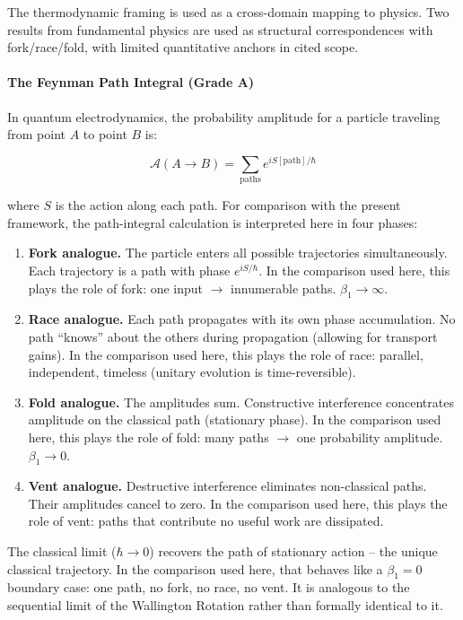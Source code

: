 \documentclass[
  11pt,
]{article}
\begin{document}
The thermodynamic framing is used as a cross-domain mapping to physics.
Two results from fundamental physics are used as structural
correspondences with fork/race/fold, with limited quantitative anchors
in cited scope.

\paragraph{The Feynman Path Integral (Grade
A)}\label{the-feynman-path-integral-grade-a}

In quantum electrodynamics, the probability amplitude for a particle
traveling from point \(A\) to point \(B\) is:

\[
\mathcal{A}(A \to B) = \sum_{\text{paths}} e^{iS[\text{path}]/\hbar}
\]

where \(S\) is the action along each path. For comparison with the
present framework, the path-integral calculation is interpreted here in
four phases:

\begin{enumerate}
\def\labelenumi{\arabic{enumi}.}
\item
  \textbf{Fork analogue.} The particle enters all possible trajectories
  simultaneously. Each trajectory is a path with phase \(e^{iS/\hbar}\).
  In the comparison used here, this plays the role of fork: one input
  \(\to\) innumerable paths. \(\beta_1 \to \infty\).
\item
  \textbf{Race analogue.} Each path propagates with its own phase
  accumulation. No path ``knows'' about the others during propagation
  (allowing for transport gains). In the comparison used here, this
  plays the role of race: parallel, independent, timeless (unitary
  evolution is time-reversible).
\item
  \textbf{Fold analogue.} The amplitudes sum. Constructive interference
  concentrates amplitude on the classical path (stationary phase). In
  the comparison used here, this plays the role of fold: many paths
  \(\to\) one probability amplitude. \(\beta_1 \to 0\).
\item
  \textbf{Vent analogue.} Destructive interference eliminates
  non-classical paths. Their amplitudes cancel to zero. In the
  comparison used here, this plays the role of vent: paths that
  contribute no useful work are dissipated.
\end{enumerate}

The classical limit (\(\hbar \to 0\)) recovers the path of stationary
action -- the unique classical trajectory. In the comparison used here,
that behaves like a \(\beta_1 = 0\) boundary case: one path, no fork, no
race, no vent. It is analogous to the sequential limit of the Wallington
Rotation rather than formally identical to it.
\end{document}
